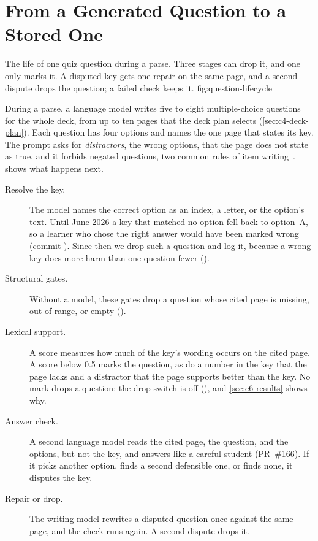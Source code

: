 \section{From a Generated Question to a Stored One}
\label{sec:c6-lifecycle}

  {The life of one quiz question during a parse. Three stages can drop it, and
   one only marks it. A disputed key gets one repair on the same page, and a
   second dispute drops the question; a failed check keeps it.}
  {fig:question-lifecycle}

During a parse, a language model writes five to eight multiple-choice
questions for the whole deck, from up to ten pages that the deck plan selects
(\cref{sec:c4-deck-plan}). Each question has four options and names the one
page that states its key. The prompt asks for \emph{distractors}, the wrong
options, that the page does not state as true, and it forbids negated
questions, two common rules of item writing~\cite{haladyna2002mcq}.
 shows what happens next.

\begin{description}
  \item[Resolve the key.] The model names the correct option as an index, a
    letter, or the option's text. Until June 2026 a key that matched no option
    fell back to option~A, so a learner who chose the right answer would have
    been marked wrong (commit ). Since then we drop such a
    question and log it, because a wrong key does more harm than one question
    fewer ().
  \item[Structural gates.] Without a model, these gates drop a question whose
    cited page is missing, out of range, or empty
    ().
  \item[Lexical support.] A score measures how much of the key's wording
    occurs on the cited page. A score below 0.5 marks the question, as do a
    number in the key that the page lacks and a distractor that the page
    supports better than the key. No mark drops a question: the drop switch is off
    (), and \cref{sec:c6-results} shows why.
  \item[Answer check.] A second language model reads the cited page, the
    question, and the options, but not the key, and answers like a careful
    student (PR~\#166). If it picks another option, finds a second defensible
    one, or finds none, it disputes the key.
  \item[Repair or drop.] The writing model rewrites a disputed question once
    against the same page, and the check runs again. A second dispute drops
    it.
\end{description}


